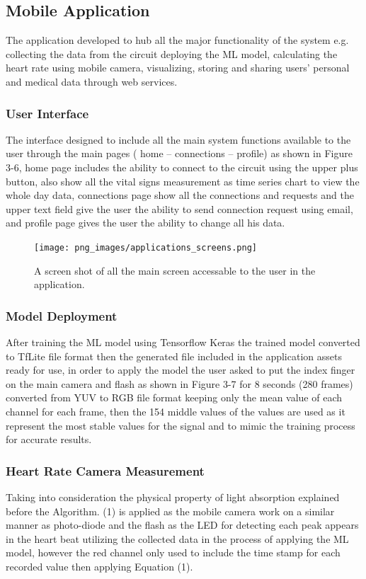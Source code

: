 \documentclass{bmcart}
\begin{document}

\subsection*{Mobile Application}
The application developed to hub all the major functionality of the system e.g.
collecting the data from the circuit deploying the ML model, calculating the
heart rate using mobile camera, visualizing, storing and sharing users' personal
and medical data through web services.
\subsubsection*{User Interface}
The interface designed to include all the main system functions available to the
user through the main pages ( home – connections – profile) as shown in Figure
3-6, home page includes the ability to connect to the circuit using the upper
plus button, also show all the vital signs measurement  as time series chart to
view the whole day  data, connections page show all the connections and requests
and the upper text field give the user the ability  to send connection request
using email, and profile page gives the user the ability to change all his data.
\begin{figure}[h!]
  \texttt{[image: png\_images/applications\_screens.png]}
  \caption{
  A screen shot of all the main screen accessable to the user in the application.}
\end{figure}
\FloatBarrier

\subsubsection*{Model Deployment}
After training the ML model using Tensorflow Keras the trained model converted
to TfLite file format then the generated file included in the application assets
ready for use, in order to apply the model the user asked to put the index
finger on the main camera and flash as shown in Figure 3-7 for 8 seconds (280
frames) converted from YUV to RGB file format keeping only the mean value of
each channel for each frame, then the 154 middle values of the values are used
as it represent the most stable values for the signal and  to mimic the training
process for accurate results.
\subsubsection*{Heart Rate Camera Measurement}
Taking into consideration the physical property of light absorption explained
before the Algorithm. (1)  is applied as the mobile camera work on a similar
manner as photo-diode and the flash as the LED for detecting each peak appears
in the heart beat utilizing the collected data in the process of applying the ML
model, however the red channel only used to include the time stamp for each
recorded value then applying Equation (1). 
\end{document}
